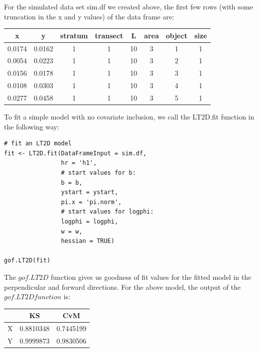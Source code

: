 \documentclass[11pt]{article}
\begin{document}
\begin{multicols}{2}
For the simulated data set sim.df we created above, the first few rows (with some truncation in the x and y values) of the data frame are:

\begin{center}
\tabcolsep=0.07cm
 \begin{tabular}{||c c c c c c c c||} 
 \hline
 x & y & stratum & transect & L & area & object & size\\ [0.5ex] 
 \hline\hline
 0.0174 & 0.0162 & 1 & 1 & 10 & 3 & 1 & 1 \\ 
 \hline
 0.0054 & 0.0223 & 1 & 1 & 10 & 3 & 2 & 1 \\
 \hline
 0.0156 & 0.0178 & 1 & 1 & 10 & 3 & 3 & 1 \\
 \hline
 0.0108 & 0.0303 & 1 & 1 & 10 & 3 & 4 & 1 \\
 \hline
 0.0277 & 0.0458 & 1 & 1 & 10 & 3 & 5 & 1 \\
 \hline
\end{tabular}
\end{center}

To fit a simple model with no covariate inclusion, we call the LT2D.fit function in the following way:

\begingroup
\small
\begin{lstlisting}
# fit an LT2D model
fit <- LT2D.fit(DataFrameInput = sim.df,
                hr = 'h1',
                # start values for b:
                b = b,
                ystart = ystart,
                pi.x = 'pi.norm',
                # start values for logphi:
                logphi = logphi,
                w = w,
                hessian = TRUE)
                
gof.LT2D(fit)
\end{lstlisting}
\endgroup

The $gof.LT2D$ function gives us goodness of fit values for the fitted model in the perpendicular and forward directions. For the above model, the output of the $gof.LT2D function$ is:
\begin{center}
 \begin{tabular}{|c c c|} 
 \hline
 \  & KS & CvM \\ [0.5ex] 
 \hline
 X & 0.8810348 & 0.7445199 \\ 
 \hline
 Y & 0.9999873 & 0.9830506  \\
 \hline
\end{tabular}
\end{center}


\end{multicols}
\end{document}
